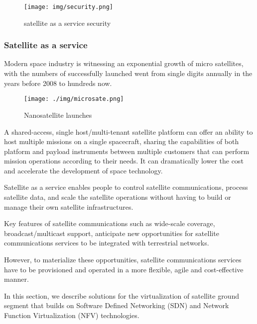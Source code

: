 \documentclass[12pt, draftclsnofoot, onecolumn]{IEEEtran}
\begin{document}
\begin{figure}
	\centering
	\texttt{[image: img/security.png]}
	\caption{satellite as a service security}
\end{figure}












\subsubsection{Satellite as a service}
Modern space industry is witnessing an exponential growth of micro satellites, with the numbers of successfully launched went from single digits annually in the years before 2008 to hundreds now\cite{nanosates}.

\begin{figure}[H]
	\centering
	\texttt{[image: ./img/microsate.png]}
	\caption{Nanosatellite launches}
\end{figure}

A shared-access, single host/multi-tenant satellite platform can offer an ability to host multiple missions  on a single spacecraft, sharing the capabilities of both platform and payload instruments between multiple customers that can perform mission operations according to their needs. It can dramatically lower the cost and accelerate the development of space technology.

Satellite as a service\cite{saas} enables people to control satellite communications, process satellite data, and scale the satellite operations without having to build  or manage their own satellite infrastructures.



Key features of satellite communications such  as  wide-scale coverage, broadcast/multicast support, anticipate new opportunities for satellite communications services to be integrated with terrestrial networks.

However, to materialize these opportunities, satellite      communications services have to be provisioned and  operated in a more flexible, agile and cost-effective manner. 









In this section, we describe solutions for   the virtualization of satellite  ground segment that builds on Software Defined Networking (SDN) and Network Function Virtualization (NFV) technologies.
\end{document}

